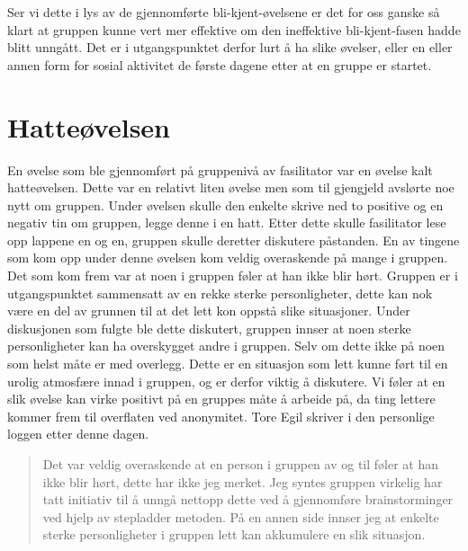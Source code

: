 Ser vi dette i lys av de gjennomførte bli-kjent-øvelsene er det for oss ganske så klart at gruppen kunne vert mer effektive om den ineffektive bli-kjent-fasen hadde blitt unngått. 
Det er i utgangspunktet derfor lurt å ha slike øvelser, eller en eller annen form for sosial aktivitet de første dagene etter at en gruppe er startet. 

\section{Hatteøvelsen}
En øvelse som ble gjennomført på gruppenivå av fasilitator var en øvelse kalt hatteøvelsen. 
Dette var en relativt liten øvelse men som til gjengjeld avslørte noe nytt om gruppen. 
Under øvelsen skulle den enkelte skrive ned to positive og en negativ tin om gruppen, legge denne i en hatt. 
Etter dette skulle fasilitator lese opp lappene en og en, gruppen skulle deretter diskutere påstanden. 
En av tingene som kom opp under denne øvelsen kom veldig overaskende på mange i gruppen. 
Det som kom frem var at noen i gruppen føler at han ikke blir hørt. 
Gruppen er i utgangspunktet sammensatt av en rekke sterke personligheter, 
dette kan nok være en del av grunnen til at det lett kon oppstå slike situasjoner. 
Under diskusjonen som fulgte ble dette diskutert, gruppen innser at noen sterke personligheter kan ha overskygget andre i gruppen. 
Selv om dette ikke på noen som helst måte er med overlegg. 
Dette er en situasjon som lett kunne ført til en urolig atmosfære innad i gruppen, og er derfor viktig å diskutere. 
Vi føler at en slik øvelse kan virke positivt på en gruppes måte å arbeide på, da ting lettere kommer frem til overflaten ved anonymitet. 
Tore Egil skriver i den personlige loggen etter denne dagen.
\begin{quote}
Det var veldig overaskende at en person i gruppen av og til føler at han ikke blir hørt, dette har ikke jeg merket. 
Jeg syntes gruppen virkelig har tatt initiativ til å unngå nettopp dette ved å gjennomføre brainstorminger ved hjelp av stepladder metoden. 
På en annen side innser jeg at enkelte sterke personligheter i gruppen lett kan akkumulere en slik situasjon. 
\end{quote}

